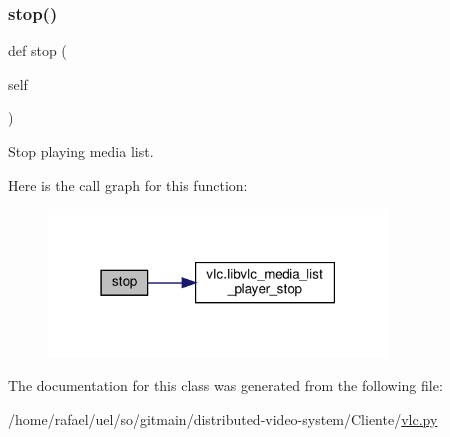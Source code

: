 \subsubsection{\texorpdfstring{stop()}{stop()}}
{\footnotesize\ttfamily def stop (\begin{DoxyParamCaption}\item[{}]{self }\end{DoxyParamCaption})}

\begin{DoxyVerb}Stop playing media list.
\end{DoxyVerb}
 Here is the call graph for this function\+:
\nopagebreak
\begin{figure}[H]
\begin{center}
\leavevmode
\includegraphics[width=255pt]{classvlc_1_1_media_list_player_a26ca7c1c7fcdd35378e7be97727047a6_cgraph}
\end{center}
\end{figure}


The documentation for this class was generated from the following file\+:\begin{DoxyCompactItemize}
\item 
/home/rafael/uel/so/gitmain/distributed-\/video-\/system/\+Cliente/\hyperlink{vlc_8py}{vlc.\+py}\end{DoxyCompactItemize}
